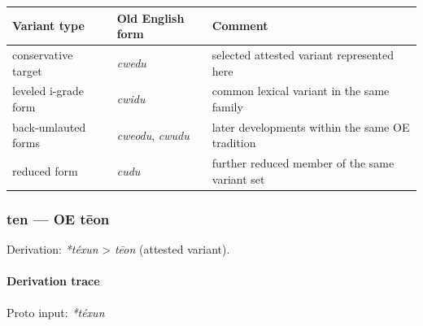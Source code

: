 \documentclass[
  british,
  a4paper,
]{article}
\newcounter{none} %
\begin{document}
{\def\LTcaptype{none} %
\begin{longtable}[]{@{}
  >{\raggedright\arraybackslash}p{}
  >{\raggedright\arraybackslash}p{}
  >{\raggedright\arraybackslash}p{}@{}}
\toprule\noalign{}
\begin{minipage}[b]{\linewidth}\raggedright
Variant type
\end{minipage} & \begin{minipage}[b]{\linewidth}\raggedright
Old English form
\end{minipage} & \begin{minipage}[b]{\linewidth}\raggedright
Comment
\end{minipage} \\
\midrule\noalign{}
\endhead
\bottomrule\noalign{}
\endlastfoot
conservative target & \emph{cwedu} & selected attested variant
represented here \\
leveled i-grade form & \emph{cwidu} & common lexical variant in the same
family \\
back-umlauted forms & \emph{cweodu}, \emph{cwudu} & later developments
within the same OE tradition \\
reduced form & \emph{cudu} & further reduced member of the same variant
set \\
\end{longtable}
}

\subsubsection{ten --- OE tēon}\label{ten-oe-tux113on}

Derivation: \emph{*téxun} \textgreater{} \emph{tēon} (attested variant).

\paragraph{Derivation trace}\label{derivation-trace-1}

Proto input: \emph{*téxun}

\begingroup
\setlength{\fboxsep}{6pt}
\end{document}
